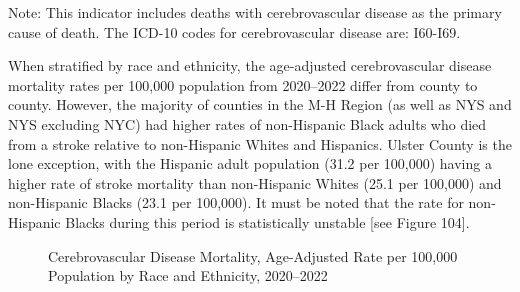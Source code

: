 \documentclass[
  english,
  letterpaper,
]{report}
\begin{document}
\begin{tcolorbox}[enhanced jigsaw, breakable, leftrule=.75mm, title=\textcolor{quarto-callout-note-color}{\faInfo}\hspace{0.5em}{Note}, bottomrule=.15mm, opacityback=0, left=2mm, colback=white, bottomtitle=1mm, coltitle=black, colbacktitle=quarto-callout-note-color!10!white, colframe=quarto-callout-note-color-frame, opacitybacktitle=0.6, toptitle=1mm, titlerule=0mm, arc=.35mm, rightrule=.15mm, toprule=.15mm]

Note: This indicator includes deaths with cerebrovascular disease as the
primary cause of death. The ICD-10 codes for cerebrovascular disease
are: I60-I69.

\end{tcolorbox}

When stratified by race and ethnicity, the age-adjusted cerebrovascular
disease mortality rates per 100,000 population from 2020--2022 differ
from county to county. However, the majority of counties in the M-H
Region (as well as NYS and NYS excluding NYC) had higher rates of
non-Hispanic Black adults who died from a stroke relative to
non-Hispanic Whites and Hispanics. Ulster County is the lone exception,
with the Hispanic adult population (31.2 per 100,000) having a higher
rate of stroke mortality than non-Hispanic Whites (25.1 per 100,000) and
non-Hispanic Blacks (23.1 per 100,000). It must be noted that the rate
for non-Hispanic Blacks during this period is statistically unstable
{[}see Figure 104{]}.

\begin{figure}


\caption{\label{fig-cerebrovasdz-mortal-rande-aar}Cerebrovascular
Disease Mortality, Age-Adjusted Rate per 100,000 Population by Race and
Ethnicity, 2020--2022}

\end{figure}%
\end{document}

